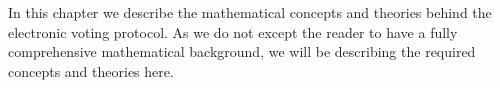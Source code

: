 In this chapter we describe the mathematical concepts and theories behind the electronic voting protocol. As we do not except the reader to have a fully comprehensive mathematical background, we will be describing the required concepts and theories here.